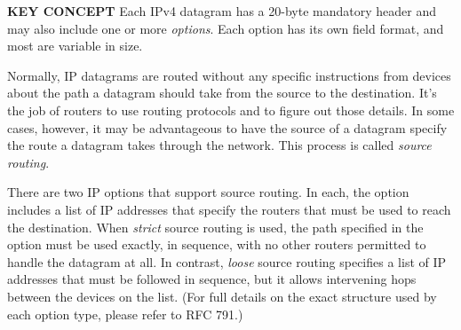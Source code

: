 {\textbf{KEY CONCEPT}} Each IPv4 datagram has a 20-byte mandatory header
and may also include one or more \emph{options}. Each option has its
own field format, and most are variable in size.

Normally, IP datagrams are routed without any specific instructions from
devices about the path a datagram should take from the source to the
destination. It's the job of routers to use routing protocols and to
figure out those details. In some cases, however, it may be advantageous
to have the source of a datagram specify the route a datagram takes
through the network. This process is called \emph{source routing}.

There are two IP options that support source routing. In each, the
option includes a list of IP addresses that specify the routers that
must be used to reach the destination. When \emph{strict} source
routing is used, the path specified in the option must be used exactly,
in sequence, with no other routers permitted to handle the datagram at
all. In contrast, \emph{loose} source routing specifies a list of IP
addresses that must be followed in sequence, but it allows intervening
hops between the devices on the list. (For full details on the exact
structure used by each option type, please refer to RFC 791.)
